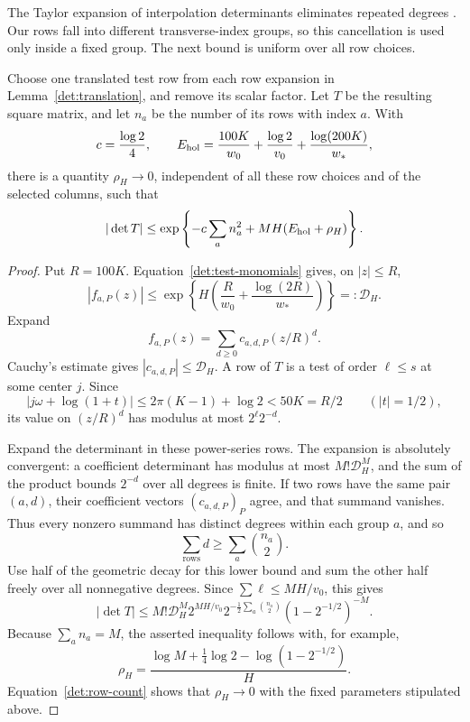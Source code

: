 The Taylor expansion of interpolation determinants eliminates repeated
degrees \cite[Theorem~1]{laurent2000}. Our rows fall into different
transverse-index groups, so this cancellation is used only inside a
fixed group. The next bound is uniform over all row choices.

\begin{lemma}\label{det:collision}
Choose one translated test row from each row expansion in
Lemma~\ref{det:translation}, and remove its scalar factor.  Let $T$ be
the resulting square matrix, and let $n_a$ be the number of its rows
with index $a$.  With
\begin{equation}
 c=\frac{\log2}{4},\qquad
 E_{\rm hol}=\frac{100K}{w_0}+\frac{\log2}{v_0}
             +\frac{\log(200K)}{w_*},
 \label{det:hol-error}
\end{equation}
there is a quantity $\rho_H\to0$, independent of all these row
choices and of the selected columns, such that
\begin{equation}
 |\det T|
 \le\exp\left\{-c\sum_a n_a^2+MH(E_{\rm hol}+\rho_H)\right\}.
 \label{det:collision-bound}
\end{equation}
\end{lemma}

\begin{proof}
Put $R=100K$.  Equation~\eqref{det:test-monomials} gives, on $|z|\le R$,
\[
 |f_{a,P}(z)|\le
 \exp\left\{H\left(\frac R{w_0}
                      +\frac{\log(2R)}{w_*}\right)\right\}
 =:\mathcal D_H.
\]
Expand
\[
 f_{a,P}(z)=\sum_{d\ge0}c_{a,d,P}(z/R)^d.
\]
Cauchy's estimate gives $|c_{a,d,P}|\le\mathcal D_H$.  A row of $T$ is
a test of order $\ell\le s$ at some center $j$.  Since
\[
 |j\omega+\log(1+t)|
 \le2\pi(K-1)+\log2<50K=R/2
 \qquad(|t|=1/2),
\]
its value on $(z/R)^d$ has modulus at most $2^\ell2^{-d}$.

Expand the determinant in these power-series rows.  The expansion is
absolutely convergent: a coefficient determinant has modulus at most
$M!\mathcal D_H^M$, and the sum of the product bounds $2^{-d}$ over
all degrees is finite.  If two rows have the same pair $(a,d)$, their
coefficient vectors $(c_{a,d,P})_P$ agree, and that summand vanishes.
Thus every nonzero summand has distinct degrees within each group
$a$, and so
\[
 \sum_{\text{rows}}d\ge\sum_a\binom{n_a}{2}.
\]
Use half of the geometric decay for this lower bound and sum the
other half freely over all nonnegative degrees.  Since
$\sum\ell\le MH/v_0$, this gives
\[
 |\det T|
 \le M!\mathcal D_H^M2^{MH/v_0}
       2^{-\frac12\sum_a\binom{n_a}{2}}
       (1-2^{-1/2})^{-M}.
\]
Because $\sum_a n_a=M$, the asserted inequality follows with, for
example,
\[
 \rho_H=\frac{\log M+\frac14\log2
                    -\log(1-2^{-1/2})}{H}.
\]
Equation~\eqref{det:row-count} shows that $\rho_H\to0$ with the fixed
parameters stipulated above.
\end{proof}

